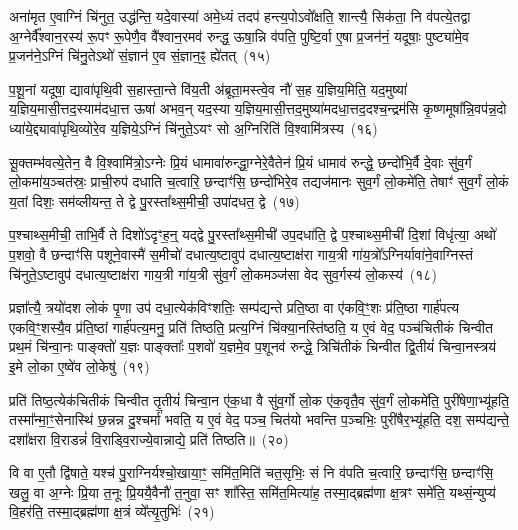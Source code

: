 अना॑मृत ए॒वाग्निं चि॑नुत॒ उद्ध॑न्ति॒ यदे॒वास्या॑ अमे॒ध्यं तदप॑ हन्त्य॒पो\-ऽवो᳚क्षति॒ शान्त्यै॒ सिक॑ता॒ नि व॑पत्ये॒तद्वा अ॒ग्नेर्वै᳚श्वान॒रस्य॑ रू॒पꣳ रू॒पेणै॒व वै᳚श्वान॒रमव॑ रुन्द्ध॒ ऊषा॒न्नि व॑पति॒ पुष्टि॒र्वा ए॒षा प्र॒जन॑नं॒ यदूषाः॒ पुष्ट्या॑मे॒व प्र॒जन॑ने॒\-ऽग्निं चि॑नु॒ते\-ऽथो॑ सं॒ज्ञान॑ ए॒व सं॒ज्ञान॒ꣴ॒ ह्ये॑तत्~(१५)

प॒शू॒नां यदूषा॒ द्यावा॑पृथि॒वी स॒हास्ता॒न्ते वि॑य॒ती अ॑ब्रूता॒मस्त्वे॒व नौ॑ स॒ह य॒ज्ञिय॒मिति॒ यद॒मुष्या॑ य॒ज्ञिय॒मासी॒त्तद॒स्याम॑दधा॒त्त ऊषा॑ अभव॒न् यद॒स्या य॒ज्ञिय॒मासी॒त्तद॒मुष्या॑मदधा॒त्तद॒दश्च॒न्द्रम॑सि कृ॒ष्णमूषा᳚न्नि॒वप॑न्न॒दो ध्या॑ये॒द्द्यावा॑पृथि॒व्योरे॒व य॒ज्ञिये॒\-ऽग्निं चि॑नुते॒\-ऽयꣳ सो अ॒ग्निरिति॑ वि॒श्वामि॑त्रस्य~(१६)

सू॒क्तम्भ॑वत्ये॒तेन॒ वै वि॒श्वामि॑त्रो॒\-ऽग्नेः प्रि॒यं धामावा॑रुन्द्धा॒ग्नेरे॒वैतेन॑ प्रि॒यं धामाव॑ रुन्द्धे॒ छन्दो॑भि॒र्वै दे॒वाः सु॑व॒र्गं लो॒कमा॑य॒ञ्चत॑स्रः॒ प्राची॒रुप॑ दधाति च॒त्वारि॒ छन्दाꣳ॑सि॒ छन्दो॑भिरे॒व तद्यज॑मानः सुव॒र्गं लो॒कमे॑ति॒ तेषाꣳ॑ सुव॒र्गं लो॒कं य॒तां दिशः॒ सम॑व्लीयन्त॒ ते द्वे पु॒रस्ता᳚थ्स॒मीची॒ उपा॑दधत॒ द्वे~(१७)

प॒श्चाथ्स॒मीची॒ ताभि॒र्वै ते दिशो॑\-ऽदृꣳह॒न्॒ यद्द्वे पु॒रस्ता᳚थ्स॒मीची॑ उप॒दधा॑ति॒ द्वे प॒श्चाथ्स॒मीची॑ दि॒शां विधृ॑त्या॒ अथो॑ प॒शवो॒ वै छन्दाꣳ॑सि पशूने॒वास्मै॑ स॒मीचो॑ दधात्य॒ष्टावुप॑ दधात्य॒ष्टाक्ष॑रा गाय॒त्री गा॑य॒त्रो᳚\-ऽग्निर्यावा॑ने॒वाग्निस्तं चि॑नुते॒\-ऽष्टावुप॑ दधात्य॒ष्टाक्ष॑रा गाय॒त्री गा॑य॒त्री सु॑व॒र्गं लो॒कमञ्ज॑सा वेद सुव॒र्गस्य॑ लो॒कस्य॑~(१८)

प्रज्ञा᳚त्यै॒ त्रयो॑दश लोकं पृ॒णा उप॑ दधा॒त्येक॑विꣳशतिः॒ सम्प॑द्यन्ते प्रति॒ष्ठा वा ए॑कवि॒ꣳ॒शः प्र॑ति॒ष्ठा गार्\mbox{}ह॑पत्य एकवि॒ꣳ॒शस्यै॒व प्र॑ति॒ष्ठां गार्\mbox{}ह॑पत्य॒मनु॒ प्रति॑ तिष्ठति॒ प्रत्य॒ग्निं चि॑क्या॒नस्ति॑ष्ठति॒ य ए॒वं वेद॒ पञ्च॑चितीकं चिन्वीत प्रथ॒मं चि॑न्वा॒नः पाङ्क्तो॑ य॒ज्ञः पाङ्क्ताः᳚ प॒शवो॑ य॒ज्ञमे॒व प॒शूनव॑ रुन्द्धे॒ त्रिचि॑तीकं चिन्वीत द्वि॒तीयं॑ चिन्वा॒नस्त्रय॑ इ॒मे लो॒का ए॒ष्वे॑व लो॒केषु॑~(१९)

प्रति॑ तिष्ठ॒त्येक॑चितीकं चिन्वीत तृ॒तीयं॑ चिन्वा॒न ए॑क॒धा वै सु॑व॒र्गो लो॒क ए॑क॒वृतै॒व सु॑व॒र्गं लो॒कमे॑ति॒ पुरी॑षेणा॒भ्यू॑हति॒ तस्मा᳚न्मा॒ꣳ॒सेनास्थि॑ छ॒न्नन्न दु॒श्चर्मा॑ भवति॒ य ए॒वं वेद॒ पञ्च॒ चित॑यो भवन्ति प॒ञ्चभिः॒ पुरी॑षैर॒भ्यू॑हति॒ दश॒ सम्प॑द्यन्ते॒ दशा᳚क्षरा वि॒राडन्नं॑ वि॒राड्वि॒राज्ये॒वान्नाद्ये॒ प्रति॑ तिष्ठति॥~(२०)

{}%

वि वा ए॒तौ द्वि॑षाते॒ यश्च॑ पु॒राग्निर्यश्चो॒खाया॒ꣳ॒ समि॑त॒मिति॑ चत॒सृभिः॒ सं नि व॑पति च॒त्वारि॒ छन्दाꣳ॑सि॒ छन्दाꣳ॑सि॒ खलु॒ वा अ॒ग्नेः प्रि॒या त॒नूः प्रि॒ययै॒वैनौ॑ त॒नुवा॒ सꣳ शा᳚स्ति॒ समि॑त॒मित्या॑ह॒ तस्मा॒द्ब्रह्म॑णा क्ष॒त्रꣳ समे॑ति॒ यथ्सं॒न्युप्य॑ वि॒हर॑ति॒ तस्मा॒द्ब्रह्म॑णा क्ष॒त्रं व्ये᳚त्यृ॒तुभिः॑~(२१)

